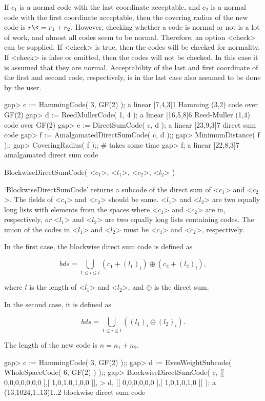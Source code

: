 If $c_1$ is a normal code with the last coordinate acceptable, and  $c_2$
is a normal code with the first coordinate acceptable, then the  covering
radius of the new code is $ r \<= r_1 + r_2 $. However, checking  whether
a code is normal or not is a lot of work, and almost all codes seem to be
normal. Therefore, an option <check> can be supplied. If <check> is true,
then the codes will be checked for normality.  If  <check>  is  false  or
omitted, then the codes will not be checked. In this case it  is  assumed
that they are normal. Acceptability of the last and first  coordinate  of
the first and second code, respectively, is in the last case also assumed
to be done by the user.

\beginexample
gap> c := HammingCode( 3, GF(2) );
a linear [7,4,3]1 Hamming (3,2) code over GF(2)
gap> d := ReedMullerCode( 1, 4 );
a linear [16,5,8]6 Reed-Muller (1,4) code over GF(2)
gap> e := DirectSumCode( c, d );
a linear [23,9,3]7 direct sum code
gap> f := AmalgamatedDirectSumCode( c, d );;
gap> MinimumDistance( f );;
gap> CoveringRadius( f );; # takes some time
gap> f;
a linear [22,8,3]7 amalgamated direct sum code
\endexample

\>BlockwiseDirectSumCode( <$c_1$>, <$l_1$>, <$c_2$>, <$l_2$> )

`BlockwiseDirectSumCode' returns a subcode of the direct sum  of  <$c_1$>
and <$c_2$>. The fields of <$c_1$> and <$c_2$> should  be  same.  <$l_1$>
and <$l_2$> are two equally long lists  with  elements  from  the  spaces
where <$c_1$> and <$c_2$> are in,  respectively,  {\it  or}  <$l_1$>  and
<$l_2$> are two equally long lists containing codes.  The  union  of  the
codes in <$l_1$> and <$l_2$> must be <$c_1$> and <$c_2$>, respectively.

In the first case, the blockwise direct sum code is defined as

$$
bds = \bigcup_{1 \leq i \leq l} ( c_1 + (l_1)_i ) \oplus ( c_2 + (l_2)_i ),
$$

where $l$ is the length of <$l_1$>  and  <$l_2$>,  and  $\oplus$  is  the
direct sum.

In the second case, it is defined as

$$
bds = \bigcup_{1 \leq i \leq l} ( (l_1)_i \oplus (l_2)_i ).
$$

The length of the new code is $ n = n_1 + n_2 $.

\beginexample
gap> c := HammingCode( 3, GF(2) );;
gap> d := EvenWeightSubcode( WholeSpaceCode( 6, GF(2) ) );;
gap> BlockwiseDirectSumCode( c, [[ 0,0,0,0,0,0,0 ],[ 1,0,1,0,1,0,0 ]],
> d, [[ 0,0,0,0,0,0 ],[ 1,0,1,0,1,0 ]] );
a (13,1024,1..13)1..2 blockwise direct sum code
\endexample

